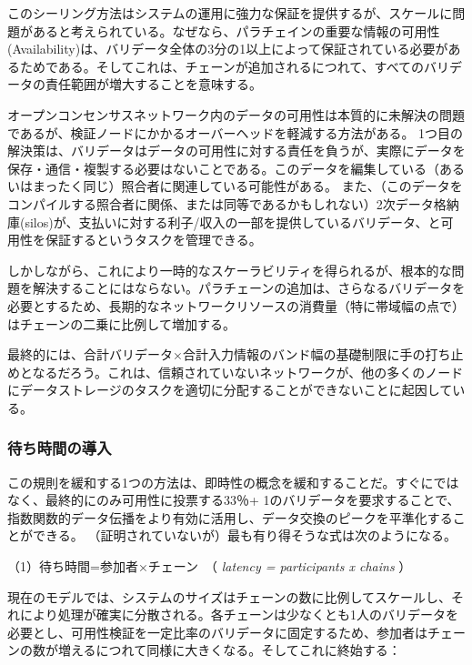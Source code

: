 このシーリング方法はシステムの運用に強力な保証を提供するが、スケールに問題があると考えられている。なぜなら、パラチェインの重要な情報の可用性(Availability)は、バリデータ全体の3分の1以上によって保証されている必要があるためである。そしてこれは、チェーンが追加されるにつれて、すべてのバリデータの責任範囲が増大することを意味する。

オープンコンセンサスネットワーク内のデータの可用性は本質的に未解決の問題であるが、検証ノードにかかるオーバーヘッドを軽減する方法がある。
1つ目の解決策は、バリデータはデータの可用性に対する責任を負うが、実際にデータを保存・通信・複製する必要はないことである。このデータを編集している（あるいはまったく同じ）照合者に関連している可能性がある。
また、（このデータをコンパイルする照合者に関係、または同等であるかもしれない）2次データ格納庫(silos)が、支払いに対する利子/収入の一部を提供しているバリデータ、と可用性を保証するというタスクを管理できる。

しかしながら、これにより一時的なスケーラビリティを得られるが、根本的な問題を解決することにはならない。パラチェーンの追加は、さらなるバリデータを必要とするため、長期的なネットワークリソースの消費量（特に帯域幅の点で）はチェーンの二乗に比例して増加する。

最終的には、合計バリデータ×合計入力情報のバンド幅の基礎制限に手の打ち止めとなるだろう。これは、信頼されていないネットワークが、他の多くのノードにデータストレージのタスクを適切に分配することができないことに起因している。

\hypertarget{ux5f85ux3061ux6642ux9593ux306eux5c0eux5165}{%
\subsubsection{待ち時間の導入}\label{ux5f85ux3061ux6642ux9593ux306eux5c0eux5165}}

この規則を緩和する1つの方法は、即時性の概念を緩和することだ。すぐにではなく、最終的にのみ可用性に投票する33％+
1のバリデータを要求することで、指数関数的データ伝播をより有効に活用し、データ交換のピークを平準化することができる。
（証明されていないが）最も有り得そうな式は次のようになる。

（1）待ち時間=参加者×チェーン　（ \emph{latency = participants x chains}
）

現在のモデルでは、システムのサイズはチェーンの数に比例してスケールし、それにより処理が確実に分散される。各チェーンは少なくとも1人のバリデータを必要とし、可用性検証を一定比率のバリデータに固定するため、参加者はチェーンの数が増えるにつれて同様に大きくなる。そしてこれに終始する：

